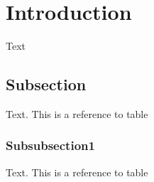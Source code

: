 \section{Introduction}\label{sec:introduction}
Text

\subsection{Subsection}
Text. This is a reference to table 
\subsubsection{Subsubsection1}
Text. This is a reference to table
